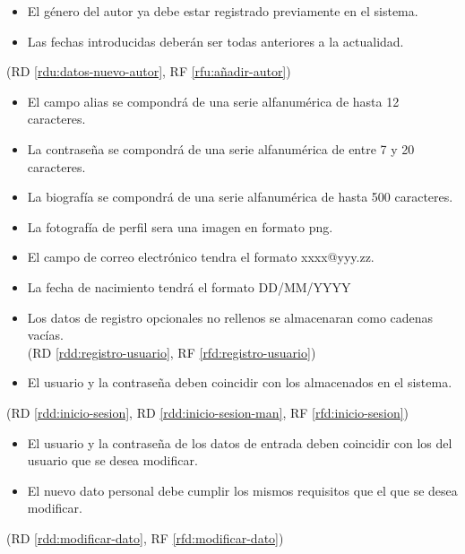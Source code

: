 \begin{itemize}
  \item El género del autor ya debe estar registrado previamente en el sistema.
  \item Las fechas introducidas deberán ser todas anteriores a la actualidad.
\end{itemize}
(RD \ref{rdu:datos-nuevo-autor}, RF \ref{rfu:añadir-autor})

\begin{itemize}
\item El campo alias se compondrá de una serie alfanumérica de hasta 12 caracteres.
\item La contraseña se compondrá de una serie alfanumérica de entre 7 y 20 caracteres.
\item La biografía se compondrá de una serie alfanumérica de hasta 500 caracteres.
\item La fotografía de perfil sera una imagen en formato png.
\item El campo de correo electrónico tendra el formato xxxx@yyy.zz.
\item La fecha de nacimiento tendrá el formato DD/MM/YYYY
\item Los datos de registro opcionales no rellenos se almacenaran como cadenas vacías.
\\
(RD \ref{rdd:registro-usuario}, RF \ref{rfd:registro-usuario})

\end{itemize}

\begin{itemize}
\item El usuario y la contraseña deben coincidir con los almacenados en el sistema.
\end{itemize}
(RD \ref{rdd:inicio-sesion}, RD \ref{rdd:inicio-sesion-man}, RF \ref{rfd:inicio-sesion})

\begin{itemize}
\item El usuario y la contraseña de los datos de entrada deben coincidir con los del usuario que se desea modificar.
\item El nuevo dato personal debe cumplir los mismos requisitos que el que se desea modificar.
\end{itemize}
(RD \ref{rdd:modificar-dato}, RF \ref{rfd:modificar-dato})


